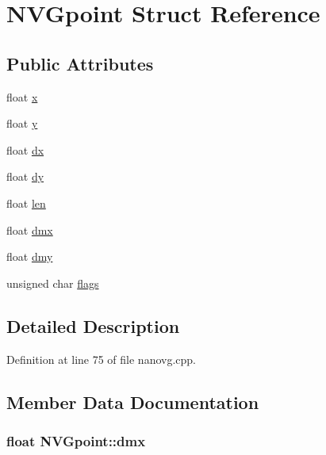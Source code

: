 \hypertarget{struct_n_v_gpoint}{\section{N\+V\+Gpoint Struct Reference}
\label{struct_n_v_gpoint}
}
\subsection*{Public Attributes}
\begin{DoxyCompactItemize}
\item 
float \hyperlink{struct_n_v_gpoint_a326d40b39869030b6c45b5b882be9fbb}{x}
\item 
float \hyperlink{struct_n_v_gpoint_a40a1ffbc5c699987afffd14a8bb4741b}{y}
\item 
float \hyperlink{struct_n_v_gpoint_a05a14d0cf2609a3aad0090d1eb90b1f2}{dx}
\item 
float \hyperlink{struct_n_v_gpoint_a3b77b6c1575026fd69f764bf30207a3a}{dy}
\item 
float \hyperlink{struct_n_v_gpoint_a6224808e39e30ade508d7abb819a2600}{len}
\item 
float \hyperlink{struct_n_v_gpoint_afc6439309cd324716d46c9531cd6a9fb}{dmx}
\item 
float \hyperlink{struct_n_v_gpoint_aed3b812230172a44e00d8f305b2fc3bc}{dmy}
\item 
unsigned char \hyperlink{struct_n_v_gpoint_a0df9b61eba4d68d5ec44ccbfe78b7bf0}{flags}
\end{DoxyCompactItemize}


\subsection{Detailed Description}


Definition at line 75 of file nanovg.\+cpp.



\subsection{Member Data Documentation}
\hypertarget{struct_n_v_gpoint_afc6439309cd324716d46c9531cd6a9fb}{
\subsubsection[{dmx}]{\setlength{\rightskip}{0pt plus 5cm}float N\+V\+Gpoint\+::dmx}}\label{struct_n_v_gpoint_afc6439309cd324716d46c9531cd6a9fb}


